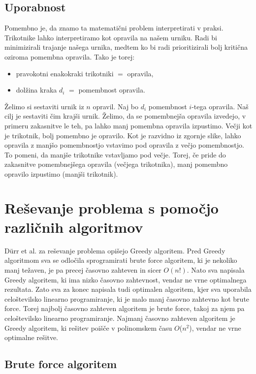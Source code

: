 \documentclass[a4paper,12pt]{article}
\theoremstyle{definition}
\theoremstyle{plain}
\begin{document}
\subsection{Uporabnost}
Pomembno je, da znamo ta matematični problem interpretirati v praksi. Trikotnike lahko interpretiramo kot opravila na našem urniku. Radi bi minimizirali trajanje našega urnika, medtem ko bi radi prioritizirali bolj kritična oziroma pomembna opravila.
Tako je torej:
\begin{itemize}
    \item pravokotni enakokraki trikotniki $=$ opravila,
    \item dolžina kraka $d_i$ $=$ pomembnost opravila.
\end{itemize}

Želimo si sestaviti urnik iz $n$ opravil. Naj bo $d_i$ pomembnost $i$-tega opravila. Naš cilj je sestaviti čim krajši urnik. Želimo, da se pomembnejša opravila izvedejo, v primeru zakasnitve le teh, pa lahko manj pomembna opravila izpustimo.
Večji kot je trikotnik, bolj pomembno je opravilo. Kot je razvidno iz zgornje slike, lahko opravila z manjšo pomembnostjo vstavimo pod opravila z večjo pomembnostjo. To pomeni, da manjše trikotnike vstavljamo pod večje. Torej, če pride do zakasnitve
pomembnejšega opravila (večjega trikotnika), manj pomembno opravilo  izpustimo (manjši trikotnik).


\section{Reševanje problema s pomočjo različnih algoritmov}
Dürr et al. \cite{triangle} za reševanje problema opišejo Greedy algoritem. Pred Greedy algoritmom sva se odločila sprogramirati brute force algoritem, ki je nekoliko manj težaven, je pa precej časovno zahteven in sicer $O(n!)$. 
Nato sva napisala Greedy algoritem, ki ima nizko časovno zahtevnost, vendar ne vrne optimalnega rezultata. Zato sva za konec napisala tudi optimalen algoritem, kjer sva uporabila celoštevilsko linearno programiranje, ki je malo manj časovno zahtevno kot brute force. Torej najbolj časovno zahteven algoritem je brute force, takoj za njem pa celoštevilsko linearno programiranje. Najmanj časovno zahteven algoritem je Greedy algoritem, ki rešitev poišče v polinomskem času $O$($n^2$), vendar ne vrne optimalne rešitve. 


\subsection{Brute force algoritem}
\end{document}
